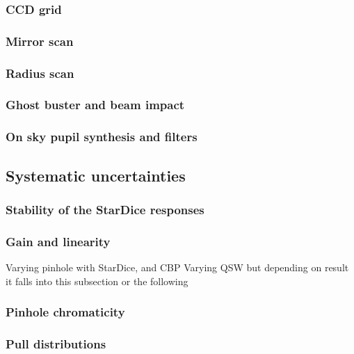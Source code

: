 \documentclass[onecolumn]{aa}
\begin{document}
\subsubsection{CCD grid}

\subsubsection{Mirror scan}

\subsubsection{Radius scan}

\subsubsection{Ghost buster and beam impact}

\subsubsection{On sky pupil synthesis and filters}



\subsection{Systematic uncertainties}
\label{sec:systematics}

\subsubsection{Stability of the StarDice responses}

\subsubsection{Gain and linearity}
\label{sec:gain}

Varying pinhole with StarDice, and CBP
Varying QSW but depending on result it falls into this subsection or the following

\subsubsection{Pinhole chromaticity}

\subsubsection{Pull distributions}
\end{document}
